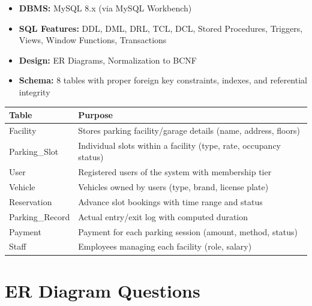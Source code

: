 \documentclass[12pt,a4paper]{article}
\begin{document}
\begin{questionbox}
\end{questionbox}
\begin{answerbox}
\begin{itemize}[nosep]
    \item \textbf{DBMS:} MySQL 8.x (via MySQL Workbench)
    \item \textbf{SQL Features:} DDL, DML, DRL, TCL, DCL, Stored Procedures, Triggers, Views, Window Functions, Transactions
    \item \textbf{Design:} ER Diagrams, Normalization to BCNF
    \item \textbf{Schema:} 8 tables with proper foreign key constraints, indexes, and referential integrity
\end{itemize}
\end{answerbox}

\begin{questionbox}
\end{questionbox}
\begin{answerbox}
\begin{longtable}{@{}lp{9cm}@{}}
\toprule
\textbf{Table} & \textbf{Purpose} \\
\midrule
Facility & Stores parking facility/garage details (name, address, floors) \\
Parking\_Slot & Individual slots within a facility (type, rate, occupancy status) \\
User & Registered users of the system with membership tier \\
Vehicle & Vehicles owned by users (type, brand, license plate) \\
Reservation & Advance slot bookings with time range and status \\
Parking\_Record & Actual entry/exit log with computed duration \\
Payment & Payment for each parking session (amount, method, status) \\
Staff & Employees managing each facility (role, salary) \\
\bottomrule
\end{longtable}
\end{answerbox}

\section{ER Diagram Questions}
\end{document}
